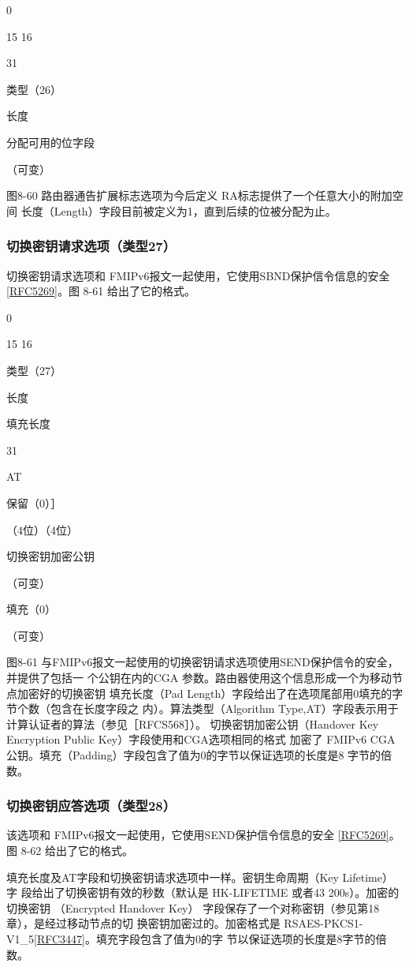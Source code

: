 0

15 16

31

类型（26）

长度

分配可用的位字段

（可变）

图8-60 路由器通告扩展标志选项为今后定义 RA标志提供了一个任意大小的附加空间
长度（Length）字段目前被定义为1，直到后续的位被分配为止。

\subsubsection{切换密钥请求选项（类型27）}
切换密钥请求选项和 FMIPv6报文一起使用，它使用SBND保护信令信息的安全
\href{https://www.rfc-editor.org/rfc/rfc5269}{[RFC5269]}。图 8-61 给出了它的格式。

0

15 16

类型（27）

长度

填充长度

31

AT

保留（0）］

（4位）（4位）

切换密钥加密公钥

（可变）

填充（0）

（可变）

图8-61 与FMIPv6报文一起使用的切换密钥请求选项使用SEND保护信令的安全，并提供了包括一
个公钥在内的CGA 参数。路由器使用这个信息形成一个为移动节点加密好的切换密钥
填充长度（Pad Length）字段给出了在选项尾部用0填充的字节个数（包含在长度字段之
内）。算法类型（Algorithm Type,AT）字段表示用于计算认证者的算法（参见［RFCS568］）。
切换密钥加密公钥（Handover Key Encryption Public Key）字段使用和CGA选项相同的格式
加密了 FMIPv6 CGA公钥。填充（Padding）字段包含了值为0的字节以保证选项的长度是8
字节的倍数。

\subsubsection{切换密钥应答选项（类型28）}
该选项和 FMIPv6报文一起使用，它使用SEND保护信令信息的安全 \href{https://www.rfc-editor.org/rfc/rfc5269}{[RFC5269]}。
图 8-62 给出了它的格式。

填充长度及AT字段和切换密钥请求选项中一样。密钥生命周期（Key Lifetime）字
段给出了切换密钥有效的秒数（默认是 HK-LIFETIME 或者43 200s）。加密的切换密钥
（Encrypted Handover Key） 字段保存了一个对称密钥（参见第18章），是经过移动节点的切
换密钥加密过的。加密格式是 RSAES-PKCS1-V1\_5\href{https://www.rfc-editor.org/rfc/rfc3447}{[RFC3447]}。填充字段包含了值为0的字
节以保证选项的长度是8字节的倍数。

